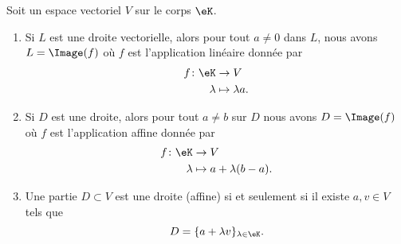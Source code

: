 \begin{lemma}       \label{LEMooRWASooOfwjdw}
	Soit un espace vectoriel \( V\) sur le corps \( \eK\).
	\begin{enumerate}
		\item       \label{ITEMooYQCIooOrhRwj}
		      Si \( L\) est une droite vectorielle, alors pour tout \( a\neq 0\) dans \( L\), nous avons \( L=\Image(f)\) où \( f\) est l'application linéaire donnée par
		      \begin{equation}
			      \begin{aligned}
				      f\colon \eK & \to V              \\
				      \lambda     & \mapsto \lambda a.
			      \end{aligned}
		      \end{equation}
		\item       \label{ITEMooZIGMooGruFMP}
		      Si \( D\) est une droite, alors pour tout \( a\neq b\) sur \( D\) nous avons \( D=\Image(f)\) où \( f\) est l'application affine donnée par
		      \begin{equation}
			      \begin{aligned}
				      f\colon \eK & \to V                   \\
				      \lambda     & \mapsto a+\lambda(b-a).
			      \end{aligned}
		      \end{equation}
		\item     \label{ITEMooOKJZooIHYDIk}
		      Une partie \( D\subset V\) est une droite (affine) si et seulement si il existe \( a,v\in V\) tels que
		      \begin{equation}
			      D=\{ a+\lambda v \}_{\lambda\in \eK}.
		      \end{equation}
	\end{enumerate}
\end{lemma}

